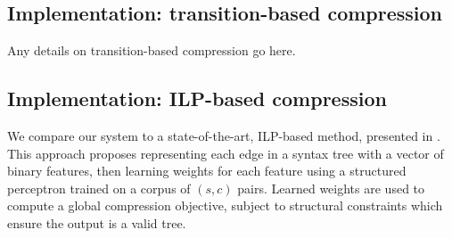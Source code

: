 \documentclass[11pt,a4paper]{article}
\DeclareMathOperator*{\argmaxA}{arg\,max} %
\begin{document}

\subsection{Implementation: transition-based compression}\label{s:transition}

Any details on transition-based compression go here.





\subsection{Implementation: ILP-based compression}\label{s:ilp}

We compare our system to a state-of-the-art, ILP-based method, presented in \citet{filippova2013overcoming}. This approach proposes representing each edge in a syntax tree with a vector of binary features, then learning weights for each feature using a structured perceptron trained on a corpus of $(s,c)$ pairs. Learned weights are used to compute a global compression objective, subject to structural constraints which ensure the output is a valid tree.
\end{document}
